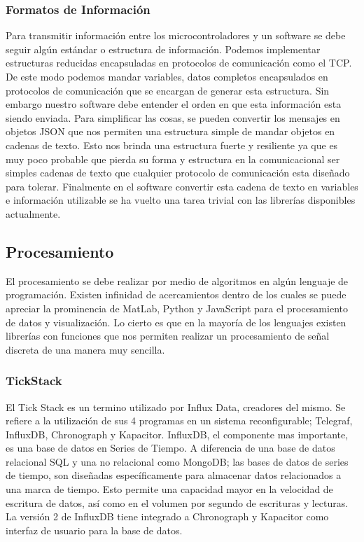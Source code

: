\subsubsection{Formatos de Información}
\label{sec:orgbe70498}
Para transmitir información entre los microcontroladores y un software se debe seguir algún estándar o estructura de información. Podemos implementar estructuras reducidas encapsuladas en protocolos de comunicación como el TCP. De este modo podemos mandar variables, datos completos encapsulados en protocolos de comunicación que se encargan de generar esta estructura. Sin embargo nuestro software debe entender el orden en que esta información esta siendo enviada. Para simplificar las cosas, se pueden convertir los mensajes en objetos JSON que nos permiten una estructura simple de mandar objetos en cadenas de texto. Esto nos brinda una estructura fuerte y resiliente ya que es muy poco probable que pierda su forma y estructura en la comunicacional ser simples cadenas de texto que cualquier protocolo de comunicación esta diseñado para tolerar. Finalmente en el software convertir esta cadena de texto en variables e información utilizable se ha vuelto una tarea trivial con las librerías disponibles actualmente.\\

\subsection{Procesamiento}
\label{sec:org53b0e70}
El procesamiento se debe realizar por medio de algoritmos en algún lenguaje de programación. Existen infinidad de acercamientos dentro de los cuales se puede apreciar la prominencia de MatLab, Python y JavaScript para el procesamiento de datos y visualización. Lo cierto es que en la mayoría de los lenguajes existen librerías con funciones que nos permiten realizar un procesamiento de señal discreta de una manera muy sencilla.\\

\subsubsection{TickStack}
\label{sec:orgada8c67}
El Tick Stack es un termino utilizado por Influx Data, creadores del mismo. Se refiere a la utilización de sus 4 programas en un sistema reconfigurable; Telegraf, InfluxDB, Chronograph y Kapacitor. InfluxDB, el componente mas importante, es una base de datos en Series de Tiempo. A diferencia de una base de datos relacional SQL y una no relacional como MongoDB; las bases de datos de series de tiempo, son diseñadas específicamente para almacenar datos relacionados a una marca de tiempo. Esto permite una capacidad mayor en la velocidad de escritura de datos, así como en el volumen por segundo de escrituras y lecturas. La versión 2 de InfluxDB tiene integrado a Chronograph y Kapacitor como interfaz de usuario para la base de datos.\\

